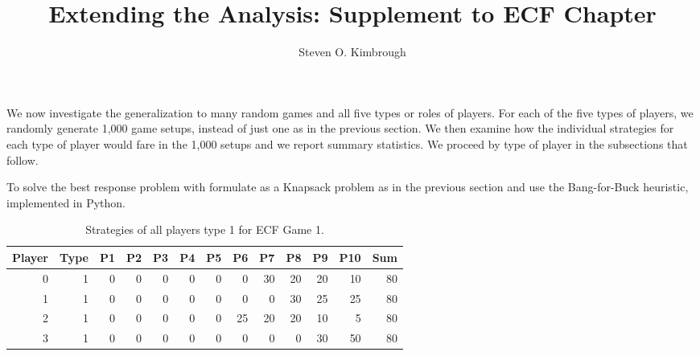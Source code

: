\documentclass[11pt, oneside]{article}   	%
\title{Extending the Analysis: Supplement to ECF Chapter}
\author{Steven O. Kimbrough}
\begin{document}
\newcount\draft
{}

\maketitle






We now investigate the generalization to many random games and all five types or roles of players. For each of the five types of players, we randomly generate 1,000 game setups, instead of just one as in the previous section. We then examine how the individual strategies for each type of player would fare in the 1,000 setups and we report summary statistics. We proceed by type of player in the subsections that follow.

To solve the best response problem with formulate as a Knapsack problem as in the previous section and use the Bang-for-Buck heuristic, implemented in Python. %

 \begin{table}[h]
 \figtop
 
 \centering

\begin{tabular}{rrrrrrrrrrrrr}
Player & Type & P1 & P2 & P3 & P4 & P5 & P6 & P7 & P8 & P9 & P10 & Sum \\ \hline
0 & 1 & 0 & 0 & 0 & 0 & 0 & 0 & 30 & 20 & 20 & 10 & 80 \\ 
1 & 1 & 0 & 0 & 0 & 0 & 0 & 0 & 0 & 30 & 25 & 25 & 80 \\ 
2 & 1 & 0 & 0 & 0 & 0 & 0 & 25 & 20 & 20 & 10 & 5 & 80 \\ 
3 & 1 & 0 & 0 & 0 & 0 & 0 & 0 & 0 & 0 & 30 & 50 & 80 \\ 
\end{tabular}
 \caption{Strategies of all players type 1 for ECF Game 1.}
 \label{table:random_panel_game_1_type_1_players}
 \figbot
 \end{table}
 
\end{document}
